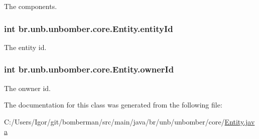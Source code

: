 The components. 

\hypertarget{classbr_1_1unb_1_1unbomber_1_1core_1_1_entity_aa5df23ec02ab11ec73f5e9a66dc682c8}{
\subsubsection[{entity\+Id}]{\setlength{\rightskip}{0pt plus 5cm}int br.\+unb.\+unbomber.\+core.\+Entity.\+entity\+Id\hspace{0.3cm}{\ttfamily [private]}}}\label{classbr_1_1unb_1_1unbomber_1_1core_1_1_entity_aa5df23ec02ab11ec73f5e9a66dc682c8}


The entity id. 

\hypertarget{classbr_1_1unb_1_1unbomber_1_1core_1_1_entity_a020f4ce97134330e74a1263c6335d017}{
\subsubsection[{owner\+Id}]{\setlength{\rightskip}{0pt plus 5cm}int br.\+unb.\+unbomber.\+core.\+Entity.\+owner\+Id\hspace{0.3cm}{\ttfamily [private]}}}\label{classbr_1_1unb_1_1unbomber_1_1core_1_1_entity_a020f4ce97134330e74a1263c6335d017}


The onwner id. 



The documentation for this class was generated from the following file\+:\begin{DoxyCompactItemize}
\item 
C\+:/\+Users/\+Igor/git/bomberman/src/main/java/br/unb/unbomber/core/\hyperlink{_entity_8java}{Entity.\+java}\end{DoxyCompactItemize}
